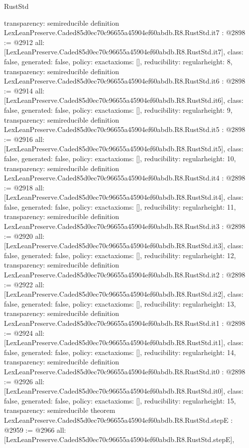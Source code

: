 \begin{lexlean}{RustStd}
\begin{coremodule}
{  transparency: semireducible
}
definition LexLeanPreserve.Caded85d0ec70c96655a45904ef60abdb.R8.RustStd.it7 : @2898 := @2912 {
  all: [LexLeanPreserve.Caded85d0ec70c96655a45904ef60abdb.R8.RustStd.it7],
  class: false,
  generated: false,
  policy: exact{axioms: []},
  reducibility: regular{height: 8},
  transparency: semireducible
}
definition LexLeanPreserve.Caded85d0ec70c96655a45904ef60abdb.R8.RustStd.it6 : @2898 := @2914 {
  all: [LexLeanPreserve.Caded85d0ec70c96655a45904ef60abdb.R8.RustStd.it6],
  class: false,
  generated: false,
  policy: exact{axioms: []},
  reducibility: regular{height: 9},
  transparency: semireducible
}
definition LexLeanPreserve.Caded85d0ec70c96655a45904ef60abdb.R8.RustStd.it5 : @2898 := @2916 {
  all: [LexLeanPreserve.Caded85d0ec70c96655a45904ef60abdb.R8.RustStd.it5],
  class: false,
  generated: false,
  policy: exact{axioms: []},
  reducibility: regular{height: 10},
  transparency: semireducible
}
definition LexLeanPreserve.Caded85d0ec70c96655a45904ef60abdb.R8.RustStd.it4 : @2898 := @2918 {
  all: [LexLeanPreserve.Caded85d0ec70c96655a45904ef60abdb.R8.RustStd.it4],
  class: false,
  generated: false,
  policy: exact{axioms: []},
  reducibility: regular{height: 11},
  transparency: semireducible
}
definition LexLeanPreserve.Caded85d0ec70c96655a45904ef60abdb.R8.RustStd.it3 : @2898 := @2920 {
  all: [LexLeanPreserve.Caded85d0ec70c96655a45904ef60abdb.R8.RustStd.it3],
  class: false,
  generated: false,
  policy: exact{axioms: []},
  reducibility: regular{height: 12},
  transparency: semireducible
}
definition LexLeanPreserve.Caded85d0ec70c96655a45904ef60abdb.R8.RustStd.it2 : @2898 := @2922 {
  all: [LexLeanPreserve.Caded85d0ec70c96655a45904ef60abdb.R8.RustStd.it2],
  class: false,
  generated: false,
  policy: exact{axioms: []},
  reducibility: regular{height: 13},
  transparency: semireducible
}
definition LexLeanPreserve.Caded85d0ec70c96655a45904ef60abdb.R8.RustStd.it1 : @2898 := @2924 {
  all: [LexLeanPreserve.Caded85d0ec70c96655a45904ef60abdb.R8.RustStd.it1],
  class: false,
  generated: false,
  policy: exact{axioms: []},
  reducibility: regular{height: 14},
  transparency: semireducible
}
definition LexLeanPreserve.Caded85d0ec70c96655a45904ef60abdb.R8.RustStd.it0 : @2898 := @2926 {
  all: [LexLeanPreserve.Caded85d0ec70c96655a45904ef60abdb.R8.RustStd.it0],
  class: false,
  generated: false,
  policy: exact{axioms: []},
  reducibility: regular{height: 15},
  transparency: semireducible
}
theorem LexLeanPreserve.Caded85d0ec70c96655a45904ef60abdb.R8.RustStd.stepE : @2959 := @2966 {
  all: [LexLeanPreserve.Caded85d0ec70c96655a45904ef60abdb.R8.RustStd.stepE],
}
\end{coremodule}
\end{lexlean}
